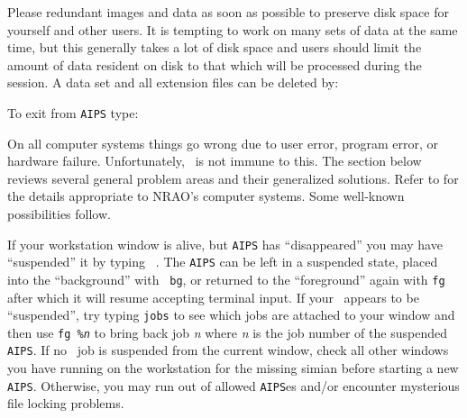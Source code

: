      Please  redundant images and data as soon as
possible to preserve disk space for yourself and other users.  It is
tempting to work on many sets of data at the same time, but this
generally takes a lot of disk space and users should limit the amount
of data resident on disk to that which will be processed during the
session.  A data set and all extension files can be deleted by:


     To exit from {\tt AIPS} type:


     On all computer systems things go wrong due to user error, program
error, or hardware failure.  Unfortunately, \AIPS\ is not immune to
this.  The section below reviews several general problem areas and
their generalized solutions.  Refer to  for the details
appropriate to NRAO's computer systems.  Some well-known possibilities
follow.


     If your workstation window is alive, but {\tt AIPS} has
``disappeared'' you may have ``suspended'' it by typing {\tt
\hbox{}}.  The {\tt AIPS} can be
left in a suspended state, placed into the ``background'' with {\tt
bg}, or returned to the ``foreground'' again with {\tt fg} after which
it will resume accepting terminal input.  If your \AIPS\ appears to be
``suspended'', try typing {\tt jobs} to see which jobs are attached to
your window and then use {\tt fg \%{{\it n\/}}} to bring back job {\it
n\/} where {\it n\/} is the job number of the suspended {\tt AIPS}\@.
If no \AIPS\ job is suspended from the current window, check all other
windows you have running on the workstation for the missing simian
before starting a new {\tt AIPS}\@.  Otherwise, you may run out of
allowed {\tt AIPS}es and/or encounter mysterious file locking
problems.

